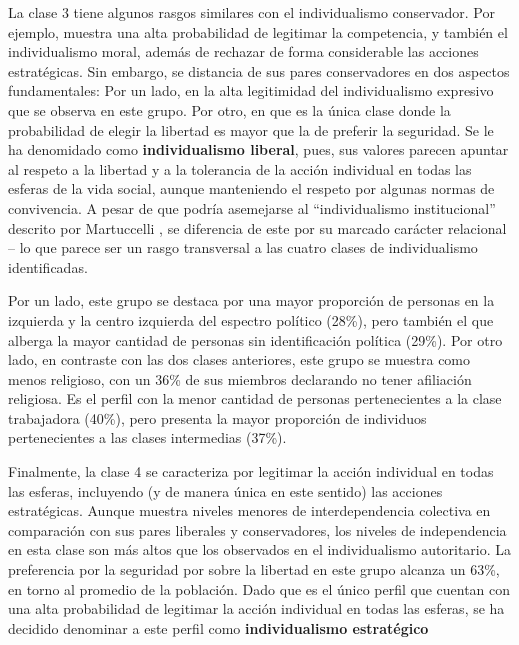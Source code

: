 \documentclass[12pt,twoside]{templates/facsothesis}
\begin{document}
La clase 3 tiene algunos rasgos similares con el individualismo conservador. Por ejemplo, muestra una alta probabilidad de legitimar la competencia, y también el individualismo moral, además de rechazar de forma considerable las acciones estratégicas. Sin embargo, se distancia de sus pares conservadores en dos aspectos fundamentales: Por un lado, en la alta legitimidad del individualismo expresivo que se observa en este grupo. Por otro, en que es la única clase donde la probabilidad de elegir la libertad es mayor que la de preferir la seguridad. Se le ha denomidado como \textbf{individualismo liberal}, pues, sus valores parecen apuntar al respeto a la libertad y a la tolerancia de la acción individual en todas las esferas de la vida social, aunque manteniendo el respeto por algunas normas de convivencia. A pesar de que podría asemejarse al ``individualismo institucional'' descrito por Martuccelli \citeyearpar{martuccelli2010}, se diferencia de este por su marcado carácter relacional -- lo que parece ser un rasgo transversal a las cuatro clases de individualismo identificadas.

Por un lado, este grupo se destaca por una mayor proporción de personas en la izquierda y la centro izquierda del espectro político (28\%), pero también el que alberga la mayor cantidad de personas sin identificación política (29\%). Por otro lado, en contraste con las dos clases anteriores, este grupo se muestra como menos religioso, con un 36\% de sus miembros declarando no tener afiliación religiosa. Es el perfil con la menor cantidad de personas pertenecientes a la clase trabajadora (40\%), pero presenta la mayor proporción de individuos pertenecientes a las clases intermedias (37\%).

Finalmente, la clase 4 se caracteriza por legitimar la acción individual en todas las esferas, incluyendo (y de manera única en este sentido) las acciones estratégicas. Aunque muestra niveles menores de interdependencia colectiva en comparación con sus pares liberales y conservadores, los niveles de independencia en esta clase son más altos que los observados en el individualismo autoritario. La preferencia por la seguridad por sobre la libertad en este grupo alcanza un 63\%, en torno al promedio de la población. Dado que es el único perfil que cuentan con una alta probabilidad de legitimar la acción individual en todas las esferas, se ha decidido denominar a este perfil como \textbf{individualismo estratégico}
\end{document}
